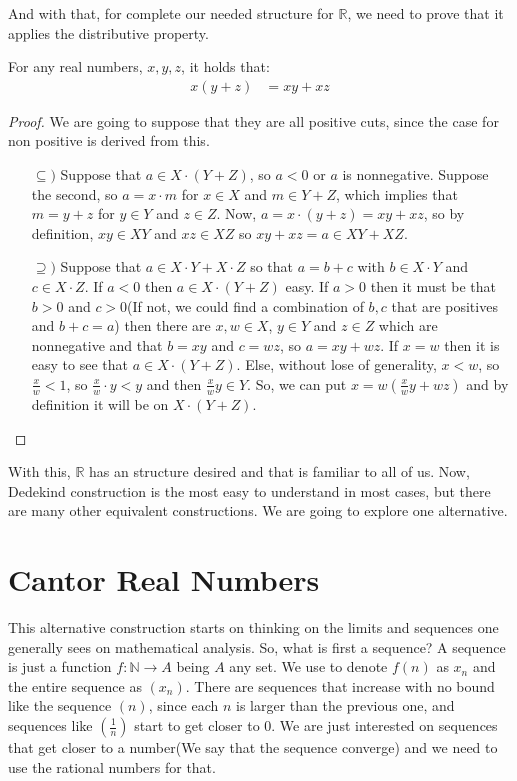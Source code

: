 \documentclass{tufte-handout}
\begin{document}
And with that, for complete our needed structure for $\mathbb{R}$, we need to prove that it applies the distributive property.

\begin{theorem}
	For any real numbers, $x, y, z$, it holds that:
	\begin{align*}
		x ( y + z ) &= xy + xz
	\end{align*}
\end{theorem}
\begin{proof}
	We are going to suppose that they are all positive cuts, since the case for non positive is derived from this.
	\begin{itemize}
		\item[$\subseteq)$] Suppose that $a \in X \cdot (Y + Z)$, so $a < 0$ or $a$ is nonnegative. Suppose the second, so $a = x \cdot m$ for $x \in X$ and $m \in Y + Z$, which implies that $m = y + z$ for $y \in Y$ and $z \in Z$. Now, $a = x\cdot(y + z) = xy + xz$, so by definition, $xy \in XY$ and $xz \in XZ$ so $xy + xz = a \in XY + XZ$.
		\item[$\supseteq)$] Suppose that $a \in X \cdot Y + X \cdot Z$ so that $a = b + c$ with $b \in X \cdot Y$ and $c \in X \cdot Z$. If $a < 0$ then $a \in X \cdot (Y + Z)$ easy. If $a > 0$ then it must be that $b > 0$ and $c > 0$(If not, we could find a combination of $b, c$ that are positives and $ b + c = a$) then there are $x, w\in X$, $y \in Y$ and $z \in Z$  which are nonnegative and that $b = xy$ and $c = wz$, so $a = xy + wz$. If $x = w$ then it is easy to see that $a \in X \cdot (Y + Z)$. Else, without lose of generality, $x < w$, so $\frac{x}{w} < 1$, so $\frac{x}{w} \cdot y < y$ and then $\frac{x}{w} y \in Y$. So, we can put $x = w(\frac{x}{w} y + wz)$ and by definition it will be on $X \cdot (Y + Z)$. 
	\end{itemize}
\end{proof}

With this, $\mathbb{R}$ has an structure desired and that is familiar to all of us. Now, Dedekind construction is the most easy to understand in most cases, but there are many other equivalent constructions. We are going to explore one alternative.


\section{Cantor Real Numbers}
This alternative construction starts on thinking on the limits and sequences one generally sees on mathematical analysis. So, what is first a sequence? A sequence is just a function $f: \mathbb{N} \to A$ being $A$ any set. We use to denote $f(n)$ as $x_n$ and the entire sequence as $(x_n)$. There are sequences that increase with no bound like the sequence $(n)$, since each $n$ is larger than the previous one, and sequences like $\left(\frac{1}{n}\right)$ start to get closer to $0$. We are just interested on sequences that get closer to a number(We say that the sequence converge) and we need to use the rational numbers for that.\\
\end{document}
